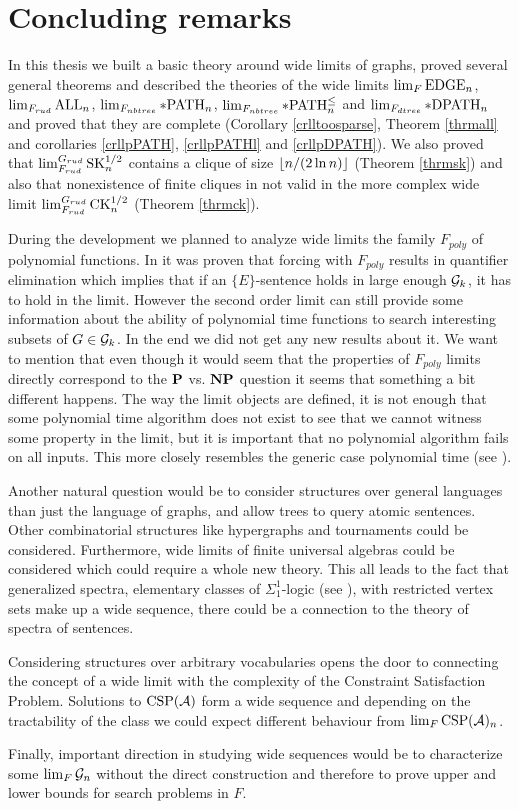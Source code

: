 \chapter*{Concluding remarks}

In this thesis we built a basic theory around wide limits of graphs, proved several general theorems and described the theories of the wide limits $\lim_F\EDGE_n$, $\lim_{F_{rud}}\ALL_n$, $\lim_{F_{nbtree}}\pPATH_n$, $\lim_{F_{nbtree}}\pPATHl_n$ and $\lim_{F_{dtree}}\pDPATH_n$ and proved that they are complete (Corollary \ref{crlltoosparse}, Theorem \ref{thrmall} and corollaries \ref{crllpPATH}, \ref{crllpPATHl} and \ref{crllpDPATH}).  We also proved that $\lim_{F_{rud}}^{G_{rud}}\SK_n^{1/2}$ contains a clique of size $\floor{n/(2\ln n)}$ (Theorem \ref{thrmsk}) and also that nonexistence of finite cliques in not valid in the more complex wide limit $\lim_{F_{rud}}^{G_{rud}}\CK_n^{1/2}$ (Theorem \ref{thrmck}).

During the development we planned to analyze wide limits the family $F_{poly}$ of polynomial functions. In \cite{krajicek2010forcing} it was proven that forcing with $F_{poly}$ results in quantifier elimination which implies that if an $\{E\}$-sentence holds in large enough $\G_k$, it has to hold in the limit. However the second order limit can still provide some information about the ability of polynomial time functions to search interesting subsets of $G\in\G_k$. In the end we did not get any new results about it. We want to mention that even though it would seem that the properties of $F_{poly}$ limits directly correspond to the $\P$ vs. $\NP$ question it seems that something a bit different happens. The way the limit objects are defined, it is not enough that some polynomial time algorithm does not exist to see that we cannot witness some property in the limit, but it is important that no polynomial algorithm fails on all inputs. This more closely resembles the generic case polynomial time (see \cite{gilman2007report}).

Another natural question would be to consider structures over general languages than just the language of graphs, and allow trees to query atomic sentences. Other combinatorial structures like hypergraphs and tournaments could be considered. Furthermore, wide limits of finite universal algebras could be considered which could require a whole new theory. This all leads to the fact that generalized spectra, elementary classes of $\Sigma_1^1$-logic (see \cite{Fagin74}), with restricted vertex sets make up a wide sequence, there could be a connection to the theory of spectra of sentences.


Considering structures over arbitrary vocabularies opens the door to connecting the concept of a wide limit with the complexity of the Constraint Satisfaction Problem. Solutions to $\text{CSP}(\A)$ form a wide sequence and depending on the tractability of the class we could expect different behaviour from $\lim_{F}\text{CSP}(\A)_n$.

Finally, important direction in studying wide sequences would be to characterize some $\lim_F\G_n$ without the direct construction and therefore to prove upper and lower bounds for search problems in $F$.
